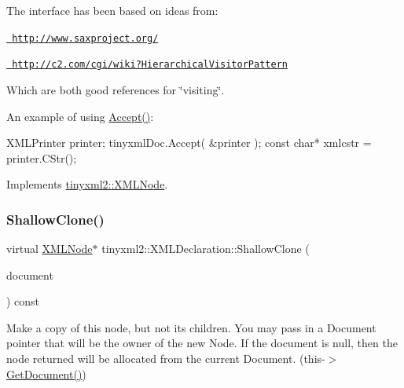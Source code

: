 The interface has been based on ideas from\+:


\begin{DoxyItemize}
\item \href{http://www.saxproject.org/}{\texttt{ http\+://www.\+saxproject.\+org/}}
\item \href{http://c2.com/cgi/wiki?HierarchicalVisitorPattern}{\texttt{ http\+://c2.\+com/cgi/wiki?\+Hierarchical\+Visitor\+Pattern}}
\end{DoxyItemize}

Which are both good references for \char`\"{}visiting\char`\"{}.

An example of using \mbox{\hyperlink{classtinyxml2_1_1XMLDeclaration_a5f376019fb34752eb248548f42f32045}{Accept()}}\+: \begin{DoxyVerb}XMLPrinter printer;
tinyxmlDoc.Accept( &printer );
const char* xmlcstr = printer.CStr();
\end{DoxyVerb}
 

Implements \mbox{\hyperlink{classtinyxml2_1_1XMLNode_a81e66df0a44c67a7af17f3b77a152785}{tinyxml2\+::\+X\+M\+L\+Node}}.

\mbox{\label{classtinyxml2_1_1XMLDeclaration_a118d47518dd9e522644e42efa259aed7}} 
\subsubsection{\texorpdfstring{ShallowClone()}{ShallowClone()}}
{\footnotesize\ttfamily virtual \mbox{\hyperlink{classtinyxml2_1_1XMLNode}{X\+M\+L\+Node}}$\ast$ tinyxml2\+::\+X\+M\+L\+Declaration\+::\+Shallow\+Clone (\begin{DoxyParamCaption}\item[{\mbox{\hyperlink{classtinyxml2_1_1XMLDocument}{X\+M\+L\+Document}} $\ast$}]{document }\end{DoxyParamCaption}) const\hspace{0.3cm}{\ttfamily [virtual]}}

Make a copy of this node, but not its children. You may pass in a Document pointer that will be the owner of the new Node. If the \textquotesingle{}document\textquotesingle{} is null, then the node returned will be allocated from the current Document. (this-\/$>$\mbox{\hyperlink{classtinyxml2_1_1XMLNode_af343d1ef0b45c0020e62d784d7e67a68}{Get\+Document()}})

